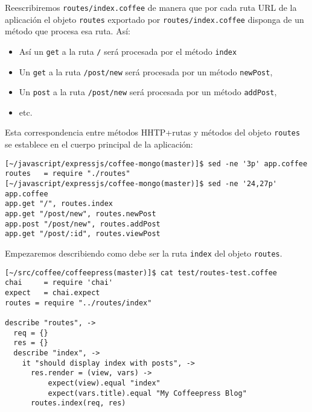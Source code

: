 Reescribiremos \verb|routes/index.coffee| de manera que por cada ruta URL de la 
aplicación el objeto \verb|routes| exportado por \verb|routes/index.coffee| disponga
de un método que procesa esa ruta. Así:
\begin{itemize}
\item Así un \verb|get| a la ruta \verb|/| será procesada por el método \verb|index|
\item Un \verb|get| a la ruta \verb|/post/new| será procesada por un método \verb|newPost|, 
\item Un \verb|post| a la ruta \verb|/post/new| será procesada por un método \verb|addPost|, 
\item etc.
\end{itemize}
Esta correspondencia entre métodos HHTP+rutas y métodos del objeto \verb|routes| 
se establece en 
el cuerpo principal de la aplicación:
\begin{verbatim}
[~/javascript/expressjs/coffee-mongo(master)]$ sed -ne '3p' app.coffee 
routes   = require "./routes"
[~/javascript/expressjs/coffee-mongo(master)]$ sed -ne '24,27p' app.coffee 
app.get "/", routes.index
app.get "/post/new", routes.newPost
app.post "/post/new", routes.addPost
app.get "/post/:id", routes.viewPost
\end{verbatim}

Empezaremos describiendo como debe ser la ruta \verb|index| del objeto
\verb|routes|.

\begin{verbatim}
[~/src/coffee/coffeepress(master)]$ cat test/routes-test.coffee 
chai     = require 'chai'
expect   = chai.expect
routes = require "../routes/index"

describe "routes", ->
  req = {}
  res = {}
  describe "index", ->
    it "should display index with posts", ->
      res.render = (view, vars) ->
          expect(view).equal "index"
          expect(vars.title).equal "My Coffeepress Blog"
      routes.index(req, res)
\end{verbatim}

